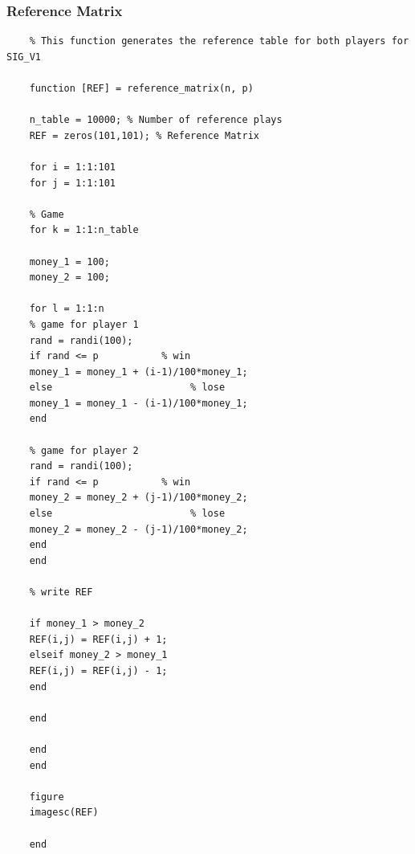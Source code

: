 \documentclass[11pt]{article}
\begin{document}
\subsubsection{Reference Matrix}
\begin{lstlisting}
	% This function generates the reference table for both players for SIG_V1
	
	function [REF] = reference_matrix(n, p)
	
	n_table = 10000; % Number of reference plays
	REF = zeros(101,101); % Reference Matrix
	
	for i = 1:1:101
	for j = 1:1:101           
	
	% Game
	for k = 1:1:n_table
	
	money_1 = 100;
	money_2 = 100;
	
	for l = 1:1:n
	% game for player 1
	rand = randi(100);
	if rand <= p           % win
	money_1 = money_1 + (i-1)/100*money_1;
	else                        % lose
	money_1 = money_1 - (i-1)/100*money_1; 
	end
	
	% game for player 2
	rand = randi(100);
	if rand <= p           % win
	money_2 = money_2 + (j-1)/100*money_2;
	else                        % lose
	money_2 = money_2 - (j-1)/100*money_2; 
	end
	end
	
	% write REF
	
	if money_1 > money_2
	REF(i,j) = REF(i,j) + 1;
	elseif money_2 > money_1
	REF(i,j) = REF(i,j) - 1;                
	end
	
	end
	
	end
	end
	
	figure
	imagesc(REF)
	
	end
\end{lstlisting}
\pagebreak
\end{document}
